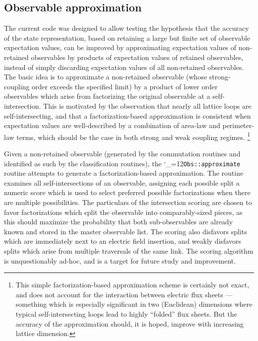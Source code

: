 \documentclass [12pt]{article}
\makeatletter
\renewcommand{\tt}{\begingroup\catcode`_=12\def\_{\string_}\tt@}
\newcommand{\tt@}[1]{\texttt{#1}\endgroup}
\makeatother
\begin{document}
\subsection {Observable approximation}

The current code was designed to allow testing the hypothesis
that the accuracy of the state representation, based
on retaining a large but finite set of observable
expectation values,
can be improved by approximating expectation values
of non-retained observables by products of expectation
values of retained observables, instead of simply
discarding expectation values of all non-retained observables.
The basic idea is to approximate a non-retained
observable (whose strong-coupling order exceeds the
specified limit) by a product of lower order
observables which arise from factorizing the 
original observable at a self-intersection.
This is motivated by the observation that
nearly all lattice loops are self-intersecting,
and that a factorization-based approximation is
consistent when expectation values
are well-described by a combination of area-law
and perimeter-law terms, which should be the case
in both strong and weak coupling regimes.%
\footnote
    {%
    This simple factorization-based approximation scheme
    is certainly not exact, and does not account for the
    interaction between electric flux sheets ---
    something which is especially significant in two (Euclidean)
    dimensions where typical self-intersecting loops lead to highly
    ``folded'' flux sheets.
    But the accuracy of the approximation should, it is hoped,
    improve with increasing lattice dimension.
    }

Given a non-retained observable (generated by the commutation
routines and identified as such by the classification routines),
the \tt{Obs::approximate} routine attempts to generate
a factorization-based approximation.
The routine examines all self-intersections of an observable,
assigning each possible split a numeric score which
is used to select preferred possible factorizations when
there are multiple possibilities.
The particulars of the intersection scoring are chosen to favor
factorizations which split the observable into comparably-sized
pieces, as this should maximize the probability
that both sub-observables are already known and stored
in the master observable list.
The scoring also disfavors splits which are immediately
next to an electric field insertion, and weakly disfavors
splits which arise from multiple traversals of the same link.
The scoring algorithm is unquestionably ad-hoc,
and is a target for future study and improvement.
\end{document}
